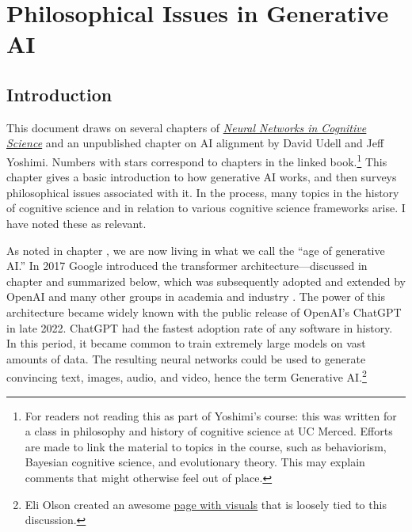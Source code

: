 \chapter{Philosophical Issues in Generative AI}\label{ch_philosophical_overview}

\section{Introduction}

This document draws on several chapters of
\href{https://downloads.jeffyoshimi.net/NeuralNetworksCogsci.pdf}{\underline{\textit{Neural Networks in Cognitive Science}}} and an unpublished chapter on AI alignment by David Udell and Jeff Yoshimi. Numbers with stars correspond to chapters in the linked book.\footnote{For readers not reading this as part of Yoshimi's course: this was written for a class in philosophy and history of cognitive science at UC Merced. Efforts are made to link the material to topics in the course, such as behaviorism, Bayesian cognitive science, and evolutionary theory. This may explain comments that might otherwise feel out of place.}  This chapter gives a basic introduction to how generative AI works, and then surveys philosophical issues associated with it. In the process, many topics in the history of cognitive science and in relation to various cognitive science frameworks arise. I have noted these as relevant.

As noted in chapter , we are now living in what we call the ``age of generative AI.'' In 2017 Google introduced the transformer architecture---discussed in chapter  and summarized below, which was subsequently adopted and extended by OpenAI and many other groups in academia and industry \cite{vaswani2017attention}. The power of this architecture became widely known with the public release of OpenAI's ChatGPT in late 2022. ChatGPT had the fastest adoption rate of any software in history. In this period, it became common to train extremely large models on vast amounts of data. The resulting neural networks could be used to generate convincing text, images, audio, and video, hence the term Generative AI.\footnote{Eli Olson created an awesome \href{https://bluelijah.github.io/Inside-LLMs/}{\underline{page with visuals}} that is loosely tied to this discussion.}

